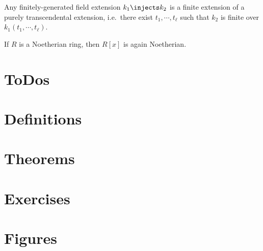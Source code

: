 \begin{theorem}\label{thm:noether_normalization}

Any finitely-generated field extension \(k_1 \injects k_2\) is a finite
extension of a purely transcendental extension, i.e.~there exist
\(t_1, \cdots, t_\ell\) such that \(k_2\) is finite over
\(k_1(t_1, \cdots, t_\ell)\).

\end{theorem}

\begin{theorem}\label{thm:hilbert_basis}

If \(R\) is a Noetherian ring, then \(R[x]\) is again Noetherian.

\end{theorem}

\section{ToDos}
\cleardoublepage

\section*{Definitions}
\renewcommand{\listtheoremname}{Definitions}
\listoftheorems[ignoreall,show={definition}, numwidth=3.5em]
\cleardoublepage

\section*{Theorems}
\renewcommand{\listtheoremname}{Theorems}
\listoftheorems[ignoreall,show={theorem,proposition}, numwidth=3.5em]
\cleardoublepage

\section*{Exercises}
\renewcommand{\listtheoremname}{Exercises}
\listoftheorems[ignoreall,show={exercise}, numwidth=3.5em]
\cleardoublepage

\section*{Figures}
\listoffigures
\cleardoublepage


\printbibliography[title=Bibliography]



